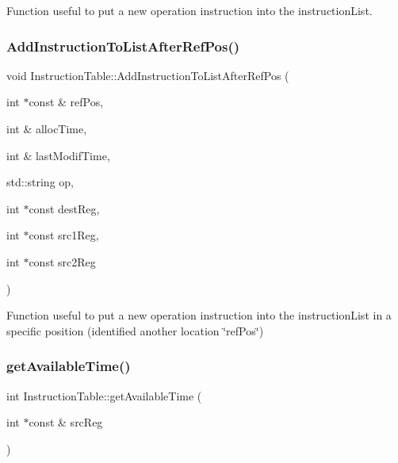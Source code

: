 Function useful to put a new operation instruction into the instruction\+List. 

\mbox{\label{classoctantis_1_1InstructionTable_a54996f84d677ac20e1edec8682aabcea}} 
\subsubsection{\texorpdfstring{Add\+Instruction\+To\+List\+After\+Ref\+Pos()}{AddInstructionToListAfterRefPos()}}
{\footnotesize\ttfamily void Instruction\+Table\+::\+Add\+Instruction\+To\+List\+After\+Ref\+Pos (\begin{DoxyParamCaption}\item[{int $\ast$const \&}]{ref\+Pos,  }\item[{int \&}]{alloc\+Time,  }\item[{int \&}]{last\+Modif\+Time,  }\item[{std\+::string}]{op,  }\item[{int $\ast$const}]{dest\+Reg,  }\item[{int $\ast$const}]{src1\+Reg,  }\item[{int $\ast$const}]{src2\+Reg }\end{DoxyParamCaption})}



Function useful to put a new operation instruction into the instruction\+List in a specific position (identified another location \char`\"{}ref\+Pos\char`\"{}) 

\mbox{\label{classoctantis_1_1InstructionTable_a1c2294b6a66fb8811b09380678f8881c}} 
\subsubsection{\texorpdfstring{get\+Available\+Time()}{getAvailableTime()}}
{\footnotesize\ttfamily int Instruction\+Table\+::get\+Available\+Time (\begin{DoxyParamCaption}\item[{int $\ast$const \&}]{src\+Reg }\end{DoxyParamCaption})}



